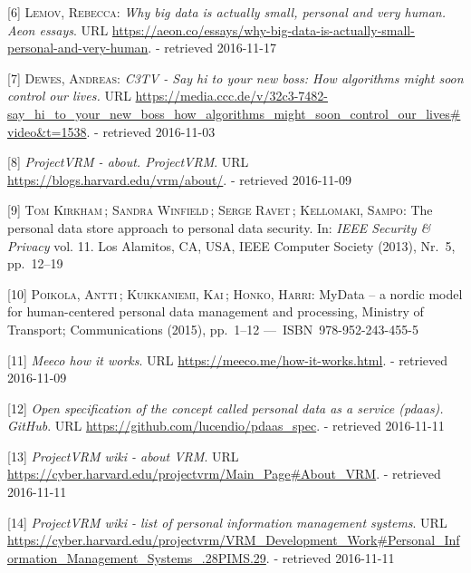 \documentclass[12pt,english,a4paper,titlepage,cleardoublepage=empty,dottedtoc]{report}
\begin{document}
\hypertarget{ref-web_2016_big-data-is-people}{}
{[}6{]} \textsc{Lemov, Rebecca}: \emph{Why big data is actually small,
personal and very human. Aeon essays}. URL
\url{https://aeon.co/essays/why-big-data-is-actually-small-personal-and-very-human}.
- retrieved 2016-11-17

\hypertarget{ref-video_2015_big-data-and-deep-learning_discrimination}{}
{[}7{]} \textsc{Dewes, Andreas}: \emph{C3TV - Say hi to your new boss:
How algorithms might soon control our lives.} URL
\url{https://media.ccc.de/v/32c3-7482-say_hi_to_your_new_boss_how_algorithms_might_soon_control_our_lives\#video\&t=1538}.
- retrieved 2016-11-03

\hypertarget{ref-web_2010_projectvrm_about}{}
{[}8{]} \emph{ProjectVRM - about. ProjectVRM}. URL
\url{https://blogs.harvard.edu/vrm/about/}. - retrieved 2016-11-09

\hypertarget{ref-paper_2013_the-personal-data-store-approach-to-personal-data-security_2013}{}
{[}9{]} \textsc{Tom Kirkham}\,; \textsc{Sandra Winfield}\,;
\textsc{Serge Ravet}\,; \textsc{Kellomaki, Sampo}: The personal data
store approach to personal data security. In: \emph{IEEE Security \&
Privacy} vol. 11. Los Alamitos, CA, USA, IEEE Computer Society (2013),
Nr.~5, pp.~12--19

\hypertarget{ref-whitepaper_2014_mydata-a-nordic-model-for-human-centered-personal-data-management-and-processing}{}
{[}10{]} \textsc{Poikola, Antti}\,; \textsc{Kuikkaniemi, Kai}\,;
\textsc{Honko, Harri}: MyData -- a nordic model for human-centered
personal data management and processing, Ministry of Transport;
Communications (2015), pp.~1--12 ---~ISBN~978-952-243-455-5

\hypertarget{ref-web_2016_meeco-how-it-works}{}
{[}11{]} \emph{Meeco how it works}. URL
\url{https://meeco.me/how-it-works.html}. - retrieved 2016-11-09

\hypertarget{ref-repo_2016_pdaas-spec}{}
{[}12{]} \emph{Open specification of the concept called personal data as
a service (pdaas). GitHub}. URL
\url{https://github.com/lucendio/pdaas_spec}. - retrieved 2016-11-11

\hypertarget{ref-web_2010_projectvrm-wiki_about-vrm}{}
{[}13{]} \emph{ProjectVRM wiki - about VRM}. URL
\url{https://cyber.harvard.edu/projectvrm/Main_Page\#About_VRM}. -
retrieved 2016-11-11

\hypertarget{ref-web_2010_projectvrm-wiki_pims-example-list}{}
{[}14{]} \emph{ProjectVRM wiki - list of personal information management
systems}. URL
\url{https://cyber.harvard.edu/projectvrm/VRM_Development_Work\#Personal_Information_Management_Systems_.28PIMS.29}.
- retrieved 2016-11-11
\end{document}
